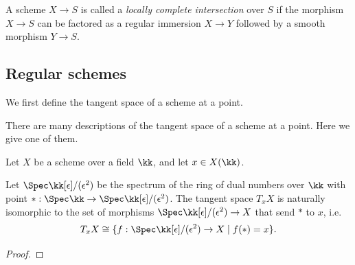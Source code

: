     \begin{definition}\label{def:locally_complete_intersection}
        A scheme \(X \to S\) is called a \emph{locally complete intersection} over \(S\) if the morphism \(X \to S\) can be factored as a regular immersion \(X \to Y\) followed by a smooth morphism \(Y \to S\).
    \end{definition}




\subsection{Regular schemes}

    We first define the tangent space of a scheme at a point.

    There are many descriptions of the tangent space of a scheme at a point. 
    Here we give one of them.

    Let $X$ be a scheme over a field $\kk$, and let $x \in X(\kk)$.

    \begin{proposition}\label{prop:tangent_space_as_image_of_ring_of_dual_numbers}
        Let \(\Spec \kk[\epsilon]/(\epsilon^2)\) be the spectrum of the ring of dual numbers over \(\kk\) with point \(*:\Spec \kk \to \Spec \kk[\epsilon]/(\epsilon^2)\).
        The tangent space $T_x X$ is naturally isomorphic to the set of morphisms $\Spec \kk[\epsilon]/(\epsilon^2) \to X$ that send \(*\) to $x$, i.e.
        \[ T_x X \cong \{ f: \Spec \kk[\epsilon]/(\epsilon^2) \to X \mid f(*) = x \}. \]
    \end{proposition}
    \begin{proof}
    \end{proof}
